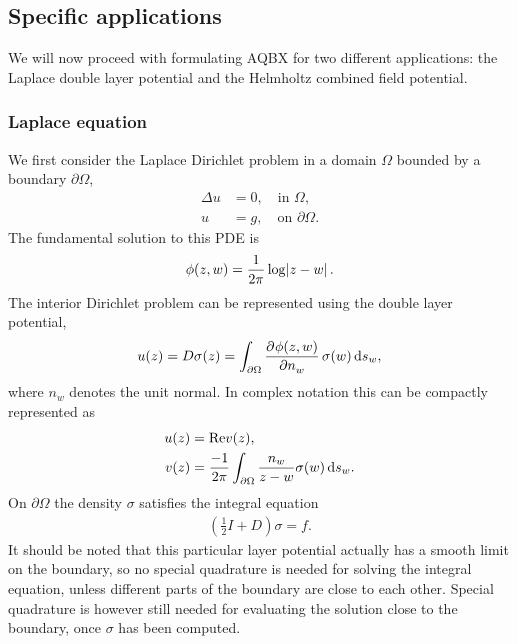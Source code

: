 \documentclass[hidelinks]{siamart1116}
\begin{document}
\subsection{Specific applications}
\label{sec:aqbx_examples}

We will now proceed with formulating AQBX for two different
applications: the Laplace double layer potential and the Helmholtz
combined field potential.

\subsubsection{Laplace equation}
\label{sec:laplace-equation}

We first consider the Laplace Dirichlet problem in a domain $\Omega$ bounded by a boundary ${{\partial\Omega}}$,
\begin{align}
  \Delta u &= 0, \quad \mbox{in } \Omega, \\
  u &= g, \quad \mbox{on } {{\partial\Omega}}.
\end{align}
The fundamental solution to this PDE is
\begin{align}
  \phi(z,w) = \frac{1}{2\pi} \log\abs{z-w} .
\end{align}
The interior Dirichlet problem can be represented using the double
layer potential,
\begin{align}
  u(z) = D{\sigma}(z) = \int_{{\partial\Omega}} \dpd{\phi(z,w)}{{{n}}_w} {\sigma}(w) \dif s_w,
  \label{eq:laplace_dbl_lyr}
\end{align}
where ${{n}}_w$ denotes the unit normal. In complex notation this can
be compactly represented as
\begin{align}
  u(z) &= {\operatorname{Re}} v(z), \\
  v(z) &= \frac{-1}{2\pi} \int_{{\partial\Omega}} \frac{{{n}}_w}{z-w} {\sigma}(w) \dif s_w .
\end{align}
On ${{\partial\Omega}}$ the density ${\sigma}$ satisfies the integral equation
\begin{align}
  \left( \frac{1}{2}I + D \right) {\sigma} = f .
  \label{eq:laplace_inteq}
\end{align}
It should be noted that this particular layer potential actually has a
smooth limit on the boundary, so no special quadrature is needed for
solving the integral equation, unless different parts of the boundary
are close to each other. Special quadrature is however still needed
for evaluating the solution close to the boundary, once ${\sigma}$ has
been computed.
\end{document}
